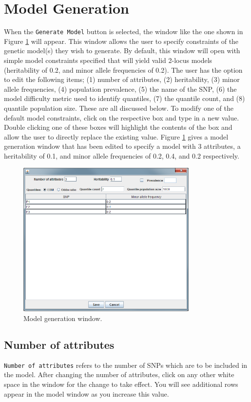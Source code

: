 \documentclass{report}
\begin{document}
\section{Model Generation}\label{modgen}
When the \texttt{Generate Model} button is selected, the window like the one shown in Figure \ref{modgenP} will appear.  This window allows the user to specify constraints of the genetic model(s) they wish to generate.  By default, this window will open with simple model constraints specified that will yield valid 2-locus models (heritability of 0.2, and minor allele frequencies of 0.2).  The user has the option to edit the following items; (1) number of attributes, (2) heritability, (3) minor allele frequencies, (4) population prevalence, (5) the name of the SNP, (6) the model difficulty metric used to identify quantiles, (7) the quantile count, and (8) quantile population size.  These are all discussed below.  To modify one of the default model constraints,  click on the respective box and type in a new value.  Double clicking one of these boxes will highlight the contents of the box and allow the user to directly replace the existing value.  Figure \ref{modgenP} gives a model generation window that has been edited to specify a model with 3 attributes, a heritability of 0.1, and minor allele frequencies of 0.2, 0.4, and 0.2 respectively.

\begin{figure}[t]
\centering
\includegraphics[width=0.8\textwidth]{Figure3_UG.png}%
\caption{Model generation window.}
\label{modgenP}
\end{figure}

\subsection{Number of attributes}
\texttt{Number of attributes} refers to the number of SNPs which are to be included in the model.  After changing the number of attributes, click on any other white space in the window for the change to take effect. You will see additional rows appear in the model window as you increase this value.  
\end{document}
